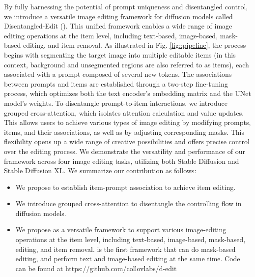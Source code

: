 


By fully harnessing the potential of prompt uniqueness and disentangled control, we introduce a versatile image editing framework for diffusion models called Disentangled-Edit (\dedit{}). This unified framework enables a wide range of image editing operations at the item level, including text-based, image-based, mask-based editing, and item removal. As illustrated in Fig. \ref{fig::pipeline}, the process begins with segmenting the target image into multiple editable items (in this context, background and unsegmented regions are also referred to as items), each associated with a prompt composed of several new tokens. 
The associations between prompts and items are established through a two-step fine-tuning process, which optimizes both the text encoder's embedding matrix and the UNet model's weights.
To disentangle prompt-to-item interactions, we introduce grouped cross-attention, which isolates attention calculation and value updates. This allows users to achieve various types of image editing by modifying prompts, items, and their associations, as well as by adjusting corresponding masks. 
This flexibility opens up a wide range of creative possibilities and offers precise control over the editing process. We demonstrate the versatility and performance of our framework across four image editing tasks, utilizing both Stable Diffusion and Stable Diffusion XL.
We summarize our contribution as follows:
\begin{itemize}
\item We propose to establish item-prompt association to achieve item editing.
\item We introduce grouped cross-attention to disentangle the controlling flow in diffusion models.
\item We propose \dedit{} as a versatile framework to support various image-editing operations at the item level, including text-based, image-based, mask-based, editing, and item removal.
\dedit{} is the first framework that can do mask-based editing, and perform text and image-based editing at the same time. Code can be found at https://github.com/collovlabs/d-edit
\end{itemize}





